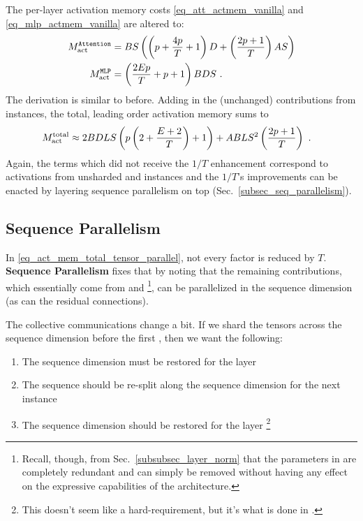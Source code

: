 The per-layer activation memory costs \eqref{eq_att_actmem_vanilla} and
\eqref{eq_mlp_actmem_vanilla} are altered to:
\begin{align}
	M _{ \rm act  } ^\texttt{Attention} & = BS \left ( \left (p + \frac{ 4p }{ T }+1 \right )D + \left
		(\frac{ 2p+1 }{ T } \right )AS  \right ) \nonumber\\
	M _{ \rm act  } ^\texttt{MLP}       & = \left (\frac{ 2Ep }{ T }+p+1 \right )BDS\ .
	\label{eq_act_mem_attn_mlp}
\end{align}
The derivation is similar to before. Adding in the (unchanged) contributions from
 instances, the total, leading order activation memory sums to
\begin{align}
	M _{ {\rm act}  } ^{ {\rm  total}  } & \approx  2BDLS   \left ( p \left (2+ \frac{ E+2 }{ T }\right ) + 1   \right )
	+ ABLS ^{ 2 } \left ( \frac{ 2p+1 }{ T }\right ) \label{eq_act_mem_total_tensor_parallel}\ .
\end{align}
Again, the terms which did not receive the $ 1/T $ enhancement correspond to activations from
unsharded  and  instances and the $ 1/T $'s improvements can
be enacted by layering sequence parallelism on top (Sec.~\ref{subsec_seq_parallelism}).


\subsection{Sequence Parallelism \label{subsec_seq_parallelism}}

In \eqref{eq_act_mem_total_tensor_parallel}, not every factor is reduced by $ T $. \textbf{Sequence
	Parallelism} fixes that by noting that the remaining contributions, which essentially come from
 and \footnote{Recall, though, from
	Sec.~\ref{subsubsec_layer_norm} that the parameters in  are completely redundant
	and can simply be removed without having any effect on the expressive capabilities of the
	architecture.}, can be parallelized in the sequence dimension (as can the residual connections).

The collective communications change a bit. If we shard the tensors across the sequence dimension
before the first , then we want the following:
\begin{enumerate}
	\item The sequence dimension must be restored for the  layer
	\item The sequence should be re-split along the sequence dimension for the next  instance
	\item The sequence dimension should be restored for the  layer \footnote{This doesn't
		      seem like a hard-requirement, but it's what is done in \cite{korthikanti2022reducing}.}
\end{enumerate}

